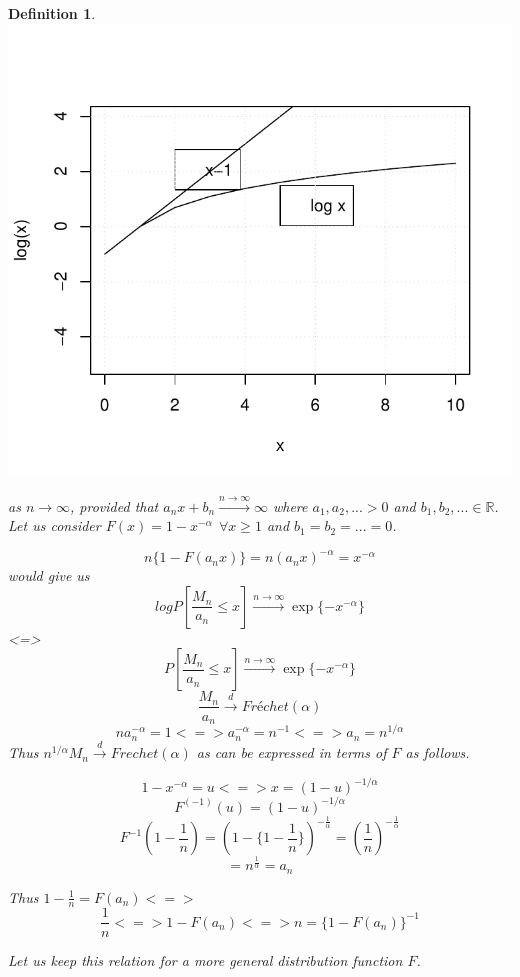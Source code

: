 \documentclass[11pt,a4paper,oneside]{article}\usepackage[]{graphicx}\usepackage[]{color}
\makeatletter
\def\maxwidth{ %
  \ifdim\Gin@nat@width>\linewidth
    \linewidth
  \else
    \Gin@nat@width
  \fi
}
\newenvironment{knitrout}{}{} %
\newtheorem{defi}[subsection]{Definition}
\makeatother
\begin{document}
\begin{algin*}
\begin{defi}
\begin{knitrout}
{\centering \includegraphics[width=\maxwidth]{figure/plot1-1} 

}



\end{knitrout}

as $n\rightarrow \infty$, provided that $a_nx+b_n\xrightarrow{n\rightarrow\infty}\infty$ where
$a_1,a_2,...>0$ and $b_1,b_2,...\in\mathbb{R}$. Let us consider $F(x)=1-x^{-\alpha}\ \ \forall x \geq 1$ and $b_1=b_2=...=0$.

$$n\{1-F(a_nx)\}=n(a_nx)^{-\alpha}=x^{-\alpha}$$
would give us 
$$log P[\frac{M_n}{a_n}\leq x]\xrightarrow{n\rightarrow\infty}\exp\{-x^{-\alpha}\}$$
<=>
$$P[\frac{M_n}{a_n}\leq x]\xrightarrow{n\rightarrow\infty}\exp\{-x^{-\alpha}\}$$
$$\frac{M_n}{a_n}\xrightarrow{d} Fréchet(\alpha)$$
$$na_n^{-\alpha}=1<=>a_n^{-\alpha}=n^{-1}<=>a_n=n^{1/\alpha}$$
Thus $n^{1/\alpha}M_n\xrightarrow{d}Frechet(\alpha)$ as  can be expressed in terms of $F$ as follows.

$$1-x^{-\alpha}=u<=>x=(1-u)^{-1/\alpha}$$
$$F^{(-1)}(u)=(1-u)^{-1/\alpha}$$
$$F^{-1}(1-\frac{1}{n})=(1-\{1-\frac{1}{n}\})^{-\frac{1}{\alpha}}=(\frac{1}{n})^{-\frac{1}{\alpha}}$$
$$=n^{\frac{1}{\alpha}}=a_n$$

Thus $1-\frac{1}{n}=F(a_n)<=>$ $$\frac{1}{n}<=>1-F(a_n)<=>n=\{1-F(a_n)\}^{-1}$$

Let us keep this relation  for a more general distribution function $F$.


\end{defi}
\end{algin*}
\end{document}
